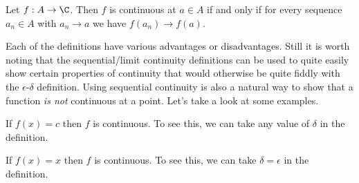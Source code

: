 \documentclass[a4paper]{scrartcl}
\begin{document}
\begin{proposition}
	Let $f : A \rightarrow \C$. Then $f$ is continuous at $a \in A$ if and only if for every sequence $a_n \in A$ with $a_n \rightarrow a$ we have $f(a_n) \rightarrow f(a)$.
\end{proposition}


Each of the definitions have various advantages or disadvantages.
Still it is worth noting that the sequential/limit continuity definitions can be used to quite easily show certain properties of continuity that would otherwise be quite fiddly with the $\epsilon$-$\delta$ definition. Using sequential continuity is also a natural way to show that a function \emph{is not} continuous at a point.
Let's take a look at some examples.

\begin{example}
	If $f(x) = c$ then $f$ is continuous. To see this, we can take any value of $\delta$ in the definition.
	\end{example}

\begin{example}[$f(x) = x$ is Continuous]
	If $f(x) = x$ then $f$ is continuous. To see this, we can take $\delta = \epsilon$ in the definition.
	\end{example}
\end{document}
